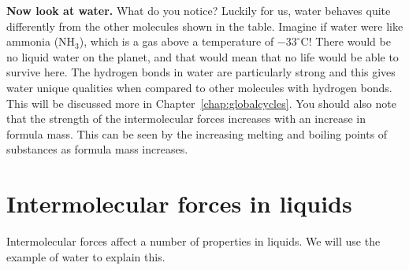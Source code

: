 \textbf{Now look at water.} What do you notice? Luckily for us, water behaves quite differently from the other molecules shown in the table. Imagine if water were like ammonia (NH$_{3}$), which is a gas above a temperature of $-33^{\circ} \text{C}$! There would be no liquid water on the planet, and that would mean that no life would be able to survive here. The hydrogen bonds in water are particularly strong and this gives water unique qualities when compared to other molecules with hydrogen bonds. This will be discussed more in Chapter~\ref{chap:globalcycles}. You should also note that the strength of the intermolecular forces increases with an increase in formula mass. This can be seen by the increasing melting and boiling points of substances as formula mass increases.


\section{Intermolecular forces in liquids}
\label{sec:intermolecular:liquids}

Intermolecular forces affect a number of properties in liquids. We will use the example of water to explain this.

